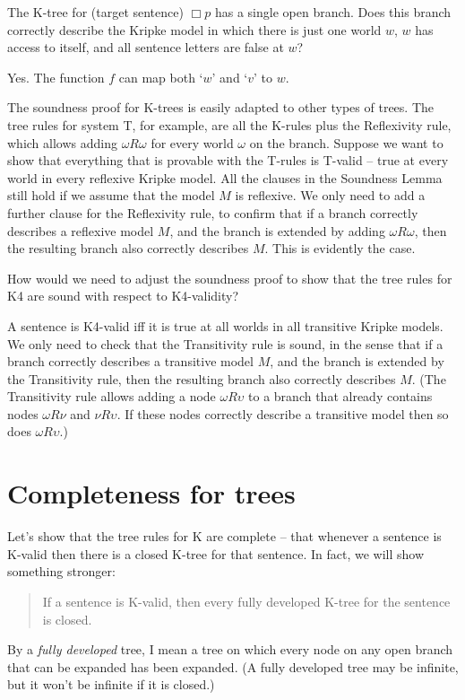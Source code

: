 \begin{exercise}
  The K-tree for (target sentence) $\Box p$ has a single open branch. Does this
  branch correctly describe the Kripke model in which there is just one world
  $w$, $w$ has access to itself, and all sentence letters are false at $w$?
\end{exercise}
\begin{solution}
  Yes. The function $f$ can map both `$w$' and `$v$' to $w$.
\end{solution}

The soundness proof for K-trees is easily adapted to other types of trees. The
tree rules for system T, for example, are all the K-rules plus the Reflexivity
rule, which allows adding $\omega R \omega$ for every world $\omega$ on the
branch. Suppose we want to show that everything that is provable with the
T-rules is T-valid -- true at every world in every reflexive Kripke model. All
the clauses in the Soundness Lemma still hold if we assume that the model $M$ is
reflexive. We only need to add a further clause for the Reflexivity rule, to
confirm that if a branch correctly describes a reflexive model $M$, and the
branch is extended by adding $\omega R \omega$, then the resulting branch also
correctly describes $M$. This is evidently the case.

\begin{exercise}
  How would we need to adjust the soundness proof to show that the tree rules
  for K4 are sound with respect to K4-validity?
\end{exercise}
\begin{solution}
  A sentence is K4-valid iff it is true at all worlds in all transitive Kripke
  models. We only need to check that the Transitivity rule is sound, in the
  sense that if a branch correctly describes a transitive model $M$, and the
  branch is extended by the Transitivity rule, then the resulting branch also
  correctly describes $M$. (The Transitivity rule allows adding a node
  $\omega R \upsilon$ to a branch that already contains nodes $\omega R \nu$ and
  $\nu R \upsilon$. If these nodes correctly describe a transitive model then so does $\omega R \upsilon$.)
\end{solution}

\section{Completeness for trees}%
\label{sec:completenesstrees}

Let's show that the tree rules for K are complete -- that whenever a sentence is
K-valid then there is a closed K-tree for that sentence. In fact, we will show
something stronger:
\begin{quote}
  If a sentence is K-valid, then every fully developed K-tree for the sentence is closed.
\end{quote}
By a \emph{fully developed} tree, I mean a tree on which every node on any open
branch that can be expanded has been expanded. (A fully developed tree may be
infinite, but it won't be infinite if it is closed.)

